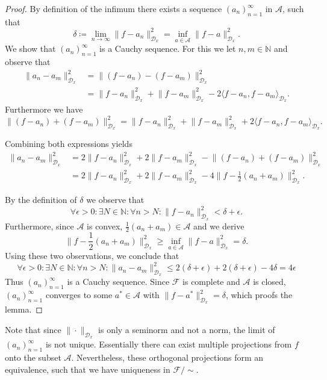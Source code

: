 \documentclass[11pt, a4paper]{article}
\newcommand{\N}{\mathbb{N}}
\newcommand{\A}{\mathcal{A}}
\newcommand{\D}{\mathcal{D}}
\newcommand{\F}{\mathcal{F}}
\begin{document}
\begin{proof}
By definition of the infimum there exists a sequence $(a_n)_{n=1}^\infty$ in $\A$, such that
\[ \delta \coloneq \lim_{n \to \infty} \big \| f - a_n \big \|_{\D_x}^2 = \inf_{a \in \A} \big \| f - a \big \|_{\D_x}^2 . \]
We show that $(a_n)_{n=1}^\infty$ is a Cauchy sequence. For this we let $n,m \in \N$ and observe that
\[ \begin{split}
\big \| a_n - a_m \big \|_{\D_x}^2 
&= \big \| (f-a_n) - (f-a_m) \big \|_{\D_x}^2 \\\
&= \big \| f - a_n \big \|_{\D_x}^2 + \big \| f - a_m \big \|_{\D_x}^2 - 2 \big \langle f-a_n, f-a_m \big \rangle_{\D_x}.
\end{split} \]
Furthermore we have
\[ \big \| (f-a_n) + (f-a_m) \big \|_{\D_x}^2 = \big \| f - a_n \big \|_{\D_x}^2 + \big \| f - a_m \big \|_{\D_x}^2 + 2 \big \langle f-a_n, f-a_m \big \rangle_{\D_x}. \]

Combining both expressions yields
\[ \begin{split}
\big \| a_n - a_m \big \|_{\D_x}^2 
&= 2 \big \| f - a_n \big \|_{\D_x}^2 + 2 \big \| f - a_m \big \|_{\D_x}^2 - \big \| (f-a_n) + (f-a_m) \big \|_{\D_x}^2 \\\
&= 2 \big \| f - a_n \big \|_{\D_x}^2 + 2 \big \| f - a_m \big \|_{\D_x}^2 - 4 \big \| f - \frac{1}{2}(a_n+a_m) \big \|_{\D_x}^2.
\end{split} \]

By the definition of $\delta$ we observe that
\[ \forall \epsilon > 0 : \exists N \in \N : \forall n > N : \big \| f - a_n \big \|_{\D_x}^2 < \delta + \epsilon. \]
Furthermore, since $\A$ is convex, $\frac{1}{2}(a_n + a_m) \in \A$ and we derive
\[ \big \| f - \frac{1}{2}(a_n+a_m) \big \|_{\D_x}^2 \geq \inf_{a \in \A} \big \| f - a \big \|_{\D_x}^2 = \delta. \]
Using these two observations, we conclude that
\[ \forall \epsilon > 0 : \exists N \in \N : \forall n > N : \big \| a_n - a_m \big \|_{\D_x}^2 \leq 2(\delta + \epsilon) + 2(\delta + \epsilon) - 4\delta = 4\epsilon \]
Thus $(a_n)_{n=1}^\infty$ is a Cauchy sequence. Since $\F$ is complete and $\A$ is closed, $(a_n)_{n=1}^\infty$ converges to some $a^* \in \A$ with $\big \| f - a^* \big \|_{\D_x}^2 = \delta$, which proofs the lemma.
\end{proof}

Note that since $\| \cdot \|_{\D_x}$ is only a seminorm and not a norm, the limit of $(a_n)_{n=1}^\infty$ is not unique. Essentially there can exist multiple projections from $f$ onto the subset $\A$. Nevertheless, these orthogonal projections form an equivalence, such that we have uniqueness in $\F/{\sim}$. \\
\end{document}
